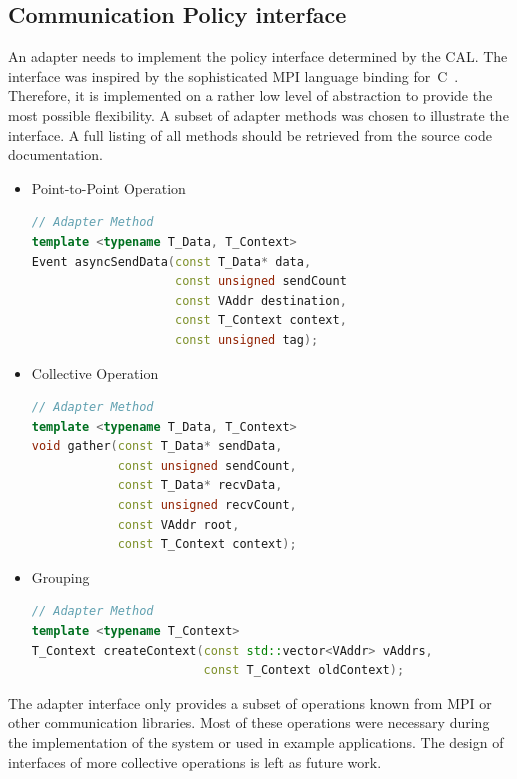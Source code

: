 \subsection{Communication Policy interface}
\label{sec:impl:policy_interface}
An adapter needs to implement the policy interface determined by the
CAL.  The interface was inspired by the sophisticated MPI language
binding for~C~\cite{ref:mpi_c_binding}. Therefore, it is implemented
on a rather low level of abstraction to provide the most possible
flexibility.  A subset of adapter methods was chosen to illustrate
the interface. A full listing of all methods should be retrieved from
the source code documentation.

\begin{itemize}

  \item Point-to-Point Operation
    \begin{lstlisting}[language=C++, breaklines=false, label={}]
// Adapter Method      
template <typename T_Data, T_Context>      
Event asyncSendData(const T_Data* data,      
                    const unsigned sendCount
                    const VAddr destination,
                    const T_Context context,
                    const unsigned tag); 
    \end{lstlisting}
    
  \item Collective Operation
    \begin{lstlisting}[language=C++, breaklines=false, label={}]
// Adapter Method      
template <typename T_Data, T_Context>      
void gather(const T_Data* sendData,
            const unsigned sendCount,
            const T_Data* recvData,
            const unsigned recvCount,
            const VAddr root,
            const T_Context context);
    \end{lstlisting}

  \item Grouping
    \begin{lstlisting}[language=C++, breaklines=false, label={}]
// Adapter Method
template <typename T_Context>      
T_Context createContext(const std::vector<VAddr> vAddrs,
                        const T_Context oldContext);
    \end{lstlisting}
  
\end{itemize}

\noindent The adapter interface only provides a subset
of operations known from MPI or other communication libraries.  Most
of these operations were necessary during the implementation of the
system or used in example applications. The design of interfaces of
more collective operations is left as future work.


